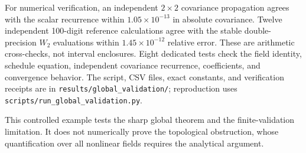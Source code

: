 For numerical verification, an independent $2\times2$ covariance
propagation agrees with the scalar recurrence within
$1.05\times10^{-13}$ in absolute covariance. Twelve independent
100-digit reference calculations agree with the stable double-precision
$W_2$ evaluations within $1.45\times10^{-12}$ relative error.
These are arithmetic cross-checks, not interval enclosures.
Eight dedicated tests check the field identity, schedule equation,
independent covariance recurrence, coefficients, and convergence behavior.
The script, CSV files, exact constants, and verification receipts are in
\texttt{results/global\_validation/}; reproduction uses
\texttt{scripts/run\_global\_validation.py}.

This controlled example tests the sharp global theorem and the
finite-validation limitation.  It does not numerically prove the
topological obstruction, whose quantification over all nonlinear fields
requires the analytical argument.
